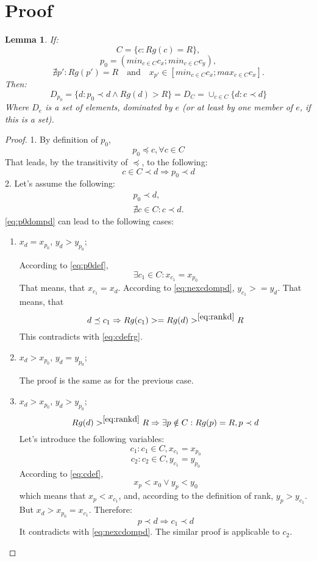 \documentclass{article}
\newtheorem{lemma1}{Lemma}
\begin{document}
\section{Proof}
\begin{lemma1}
If:
\begin{equation} \label{eq:cdefrg} C = \{c: Rg(c) = R\}, \end{equation}
\begin{equation} \label{eq:p0def} p_0 = (min_{c \in C} c_x; min_{c \in C} c_y),
\end{equation}
\begin{equation} \label{eq:cdef} \nexists p': Rg(p') = R \quad \textrm{and}
\quad x_{p'} \in [min_{c \in C} c_x; max_{c \in C} c_x].
\end{equation}
Then:
\begin{equation}
\label{eq:rankd} D_{p_0} = \{d: p_0 \prec d \wedge Rg(d) > R\} =
D_C = \cup_{c \in C} \{d: c \prec d\}
\end{equation}
Where $D_e$ is a set of elements, dominated by $e$ (or at least by one member of
$e$, if this is a set).
\end{lemma1}

\begin{proof}
1. By definition of $p_0$,
$$ p_0 \preceq c, \forall c \in C $$
That leads, by the transitivity of $\preceq$, to the following:
$$ c \in C \prec d \Rightarrow p_0 \prec d $$
2. Let's assume the following:
\begin{align}
	\label{eq:p0dompd} p_0 \prec d, \\
	\label{eq:nexcdompd} \nexists c \in C: c \prec d.
\end{align}
\eqref{eq:p0dompd} can lead to the following cases:
\begin{enumerate}
\item $x_{d} = x_{p_0}$, $y_{d} > y_{p_0}$;

According to \eqref{eq:p0def}, $$\exists c_1 \in C: x_{c_1} = x_{p_0}$$
That means, that $x_{c_1} = x_{d}$. According to \eqref{eq:nexcdompd}, $y_{c_1}
>= y_{d}$.
That means, that 
$$
d \preceq c_1 \Rightarrow Rg(c_1) >= Rg(d)>^{\eqref{eq:rankd}} R
$$
This contradicts with \eqref{eq:cdefrg}.
\item $x_{d} > x_{p_0}$, $y_{d} = y_{p_0}$;

The proof is the same as for the previous case.
\item $x_{d} > x_{p_0}$, $y_{d} > y_{p_0}$;
$$
Rg(d) >^{\eqref{eq:rankd}} R \Rightarrow \exists p \notin C: Rg(p) = R, p \prec
d
$$
Let's introduce the following variables:
$$
c_1: c_1 \in C, x_{c_1} = x_{p_0}
$$
$$
c_2: c_2 \in C, y_{c_1} = y_{p_0}
$$
According to \eqref{eq:cdef}, 
$$
x_p < x_0 \vee y_p < y_0
$$
which means that $x_p < x_{c_1}$, and, according to the definition of rank, $y_p
> y_{c_1}$.
But $x_{d} > x_{p_0} = x_{c_1}$. Therefore:
$$ 
p \prec d \Rightarrow c_1 \prec d
$$
It contradicts with \eqref{eq:nexcdompd}.
The similar proof is applicable to $c_2$.
\end{enumerate}
\end{proof}
\end{document}

